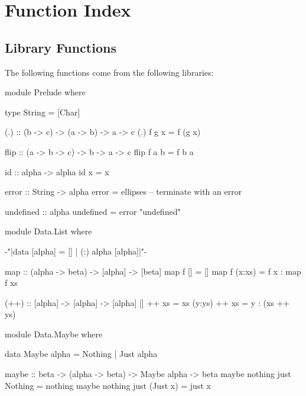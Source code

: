 
\chapter{Function Index}




\printindex


\section{Library Functions}

\begin{comment}
\begin{code}
import Prelude(Char)
ellipses = undefined
\end{code}
\end{comment}


The following functions come from the following libraries:

\begin{code}
module Prelude where

type String = [Char]

(.) :: (b -> c) -> (a -> b) -> a -> c
(.) f g x = f (g x)

flip :: (a -> b -> c) -> b -> a -> c
flip f a b = f b a

id :: alpha -> alpha
id x = x

error :: String -> alpha
error = ellipses -- terminate with an error

undefined :: alpha
undefined = error "undefined"
\end{code}

\begin{code}
module Data.List where

{-"|data [alpha] = [] | (:) alpha [alpha]|"-}

map :: (alpha -> beta) -> [alpha] -> [beta]
map f []      = []
map f (x:xs)  = f x : map f xs

(++) :: [alpha] -> [alpha] -> [alpha]
[] ++ xs = xs
(y:ys) ++ xs = y : (xs ++ ys)
\end{code}


\begin{code}
module Data.Maybe where

data Maybe alpha = Nothing | Just alpha

maybe :: beta -> (alpha -> beta) -> Maybe alpha -> beta
maybe nothing just Nothing   = nothing
maybe nothing just (Just x)  = just x
\end{code}


